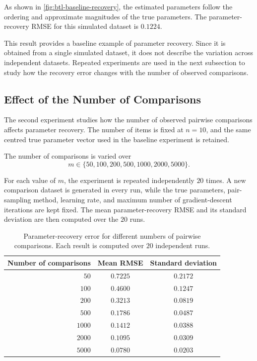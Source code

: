 \documentclass[12pt,oneside]{report}
\begin{document}
As shown in \cref{fig:btl-baseline-recovery}, the estimated parameters
follow the ordering and approximate magnitudes of the true parameters.
The parameter-recovery RMSE for this simulated dataset is \(0.1224\).

This result provides a baseline example of parameter recovery. Since it
is obtained from a single simulated dataset, it does not describe the
variation across independent datasets. Repeated experiments are used in
the next subsection to study how the recovery error changes with the
number of observed comparisons.

\subsection{Effect of the Number of Comparisons}

The second experiment studies how the number of observed pairwise
comparisons affects parameter recovery. The number of items is fixed at
\(n=10\), and the same centred true parameter vector used in the
baseline experiment is retained.

The number of comparisons is varied over
\begin{equation}
    m
    \in
    \{50,100,200,500,1000,2000,5000\}.
\end{equation}

For each value of \(m\), the experiment is repeated independently
\(20\) times. A new comparison dataset is generated in every run, while
the true parameters, pair-sampling method, learning rate, and maximum
number of gradient-descent iterations are kept fixed. The mean
parameter-recovery RMSE and its standard deviation are then computed
over the \(20\) runs.

\begin{table}[htbp]
    \centering
    \caption{Parameter-recovery error for different numbers of
    pairwise comparisons. Each result is computed over \(20\)
    independent runs.}
    \label{tab:btl-comparison-scaling}
    \begin{tabular}{rcc}
        \toprule
        Number of comparisons
        & Mean RMSE
        & Standard deviation \\
        \midrule
        \(50\)   & \(0.7225\) & \(0.2172\) \\
        \(100\)  & \(0.4600\) & \(0.1247\) \\
        \(200\)  & \(0.3213\) & \(0.0819\) \\
        \(500\)  & \(0.1786\) & \(0.0487\) \\
        \(1000\) & \(0.1412\) & \(0.0388\) \\
        \(2000\) & \(0.1095\) & \(0.0309\) \\
        \(5000\) & \(0.0780\) & \(0.0203\) \\
        \bottomrule
    \end{tabular}
\end{table}
\end{document}
